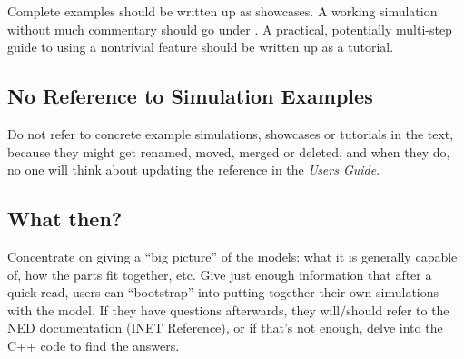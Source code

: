 Complete examples should be written up as showcases. A working simulation
without much commentary should go under . A practical,
potentially multi-step guide to using a nontrivial feature should be
written up as a tutorial.

\subsection{No Reference to Simulation Examples}
\label{sec:authorsguide:no-reference-to-simulation-examples}

Do not refer to concrete example simulations, showcases or tutorials in the text,
because they might get renamed, moved, merged or deleted, and when they
do, no one will think about updating the reference in the \textit{Users Guide}.


\subsection{What then?}
\label{sec:authorsguide:what-then}

Concentrate on giving a ``big picture'' of the models: what it is generally
capable of, how the parts fit together, etc. Give just enough information
that after a quick read, users can ``bootstrap'' into putting together
their own simulations with the model. If they have questions afterwards,
they will/should refer to the NED documentation (INET Reference), or if
that's not enough, delve into the C++ code to find the answers.




